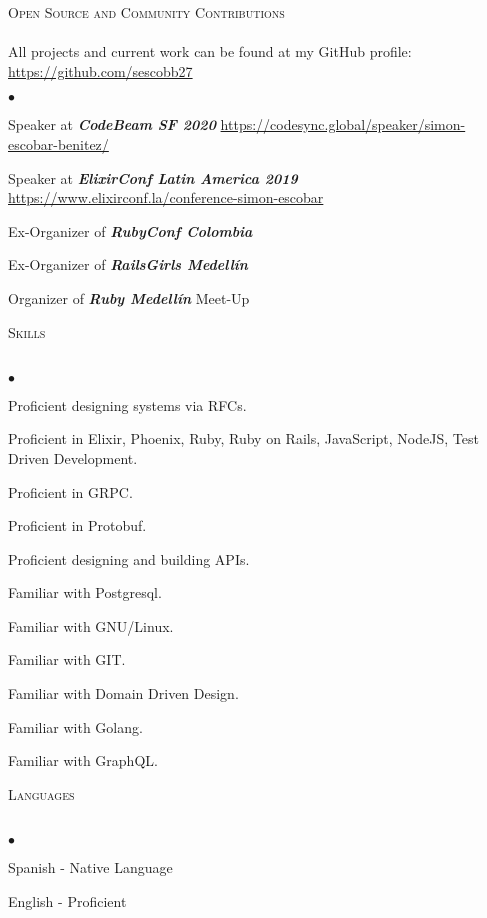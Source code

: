 \documentclass[a4paper]{article}
\newcommand{\lineunder}{\vspace*{-8pt} \\ \hspace*{-18pt} \hrulefill \\}
\newcommand{\header}[1]{{\hspace*{-15pt}\vspace*{6pt}
  \textsc{#1}} \vspace*{-6pt} \lineunder}
\newenvironment{achievements}{\begin{list}{$\bullet$}{\topsep 0pt \itemsep
  -2pt}}{\vspace*{4pt}\end{list}}
\newcommand{\emphasys}[1]{\textbf{\emph{#1}}}
\begin{document}
  \header{Open Source and Community Contributions}
  All projects and current work can be found at my GitHub profile: \url{https://github.com/sescobb27}
  \begin{achievements}
  \item{Speaker at \emphasys{CodeBeam SF 2020} \url{https://codesync.global/speaker/simon-escobar-benitez/}}
  \item{Speaker at \emphasys{ElixirConf Latin America 2019} \url{https://www.elixirconf.la/conference-simon-escobar}}
  \item{Ex-Organizer of \emphasys{RubyConf Colombia}}
  \item{Ex-Organizer of \emphasys{RailsGirls Medell\'in}}
  \item{Organizer of \emphasys{Ruby Medell\'in} Meet-Up}
  \end{achievements}

  \header{Skills}
  \begin{achievements}
  \item {Proficient designing systems via RFCs.}
  \item {Proficient in Elixir, Phoenix, Ruby, Ruby on Rails, JavaScript, NodeJS, Test Driven Development.}
  \item {Proficient in GRPC.}
  \item {Proficient in Protobuf.}
  \item {Proficient designing and building APIs.}
  \item {Familiar with Postgresql.}
  \item {Familiar with GNU/Linux.}
  \item {Familiar with GIT.}
  \item {Familiar with Domain Driven Design.}
  \item {Familiar with Golang.}
  \item {Familiar with GraphQL.}
  \end{achievements}
  \header{Languages}
  \begin{achievements}
  \item{Spanish - Native Language}
  \item{English - Proficient}
  \end{achievements}
\end{document}
